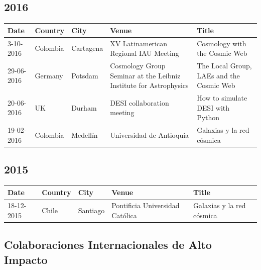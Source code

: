 \documentclass{article}
\begin{document}
\subsection*{2016}
\noindent
\begin{tabular}{p{2.0cm} p{1.5cm} p{1.5cm} p{5.0cm} p{5.0cm}}\hline
Date & Country & City& Venue & Title\\\hline
3-10-2016 & Colombia & Cartagena & XV Latinamerican Regional IAU Meeting & Cosmology with the Cosmic Web\\
29-06-2016 & Germany & Potsdam & Cosmology Group Seminar at the Leibniz Institute for Astrophysics & The Local Group, LAEs and the Cosmic Web\\
20-06-2016 & UK & Durham & DESI collaboration meeting & How to simulate DESI with Python\\
19-02-2016 & Colombia & Medell\'in & Universidad de Antioquia & Galaxias y la red c\'osmica\\
\end{tabular}

\subsection*{2015}
\noindent
\begin{tabular}{p{2.0cm} p{1.5cm} p{1.5cm} p{5.0cm} p{5.0cm}}\hline
Date & Country & City& Venue & Title\\\hline
18-12-2015 & Chile & Santiago & Pontificia Universidad Cat\'olica& Galaxias y la red c\'osmica \\
\end{tabular}


\subsection{Colaboraciones Internacionales de Alto Impacto}
\end{document}
